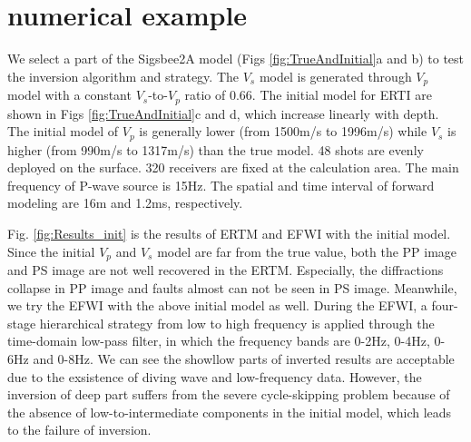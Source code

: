 \documentclass[extra,mreferee]{gji}
\begin{document}
\section{numerical example}
We select a part of the Sigsbee2A model (Figs
\ref{fig:TrueAndInitial}a and b) to test the inversion algorithm and strategy.
The $V_s$ model is generated through $V_p$ model with a constant $V_s$-to-$V_p$ ratio of 0.66. 
The initial model for ERTI are shown in 
Figs \ref{fig:TrueAndInitial}c and d, which increase linearly with depth.
The initial model of $V_p$ is generally lower (from 1500m/s to 1996m/s) while 
$V_s$ is higher  (from 990m/s to 1317m/s) than the true model. 
48 shots are evenly deployed on the surface.
320 receivers are fixed at the calculation area.
The main frequency of P-wave source is 15Hz.
The spatial and time interval of forward modeling are 16m and 1.2ms, respectively.

Fig. \ref{fig:Results_init} is the results of ERTM and EFWI with the initial model.
Since the initial
$V_p$ and $V_s$ model are far from the true value, both the PP image  and PS
image are not well recovered
in the ERTM. Especially, the diffractions collapse in PP image and faults almost can not be seen
in PS image. Meanwhile, we try the EFWI with the above initial model as well. 
During the EFWI, 
a four-stage hierarchical strategy 
from low to high frequency is applied through the time-domain low-pass filter, in which the frequency bands
are 0-2Hz, 0-4Hz, 0-6Hz and 0-8Hz. 
We can see the showllow parts of inverted results 
are acceptable due to the exsistence of diving wave and low-frequency data. However, the inversion of
deep part suffers from the severe cycle-skipping problem because of the absence of
low-to-intermediate components in the initial model, which leads to the failure of inversion.
\end{document}
